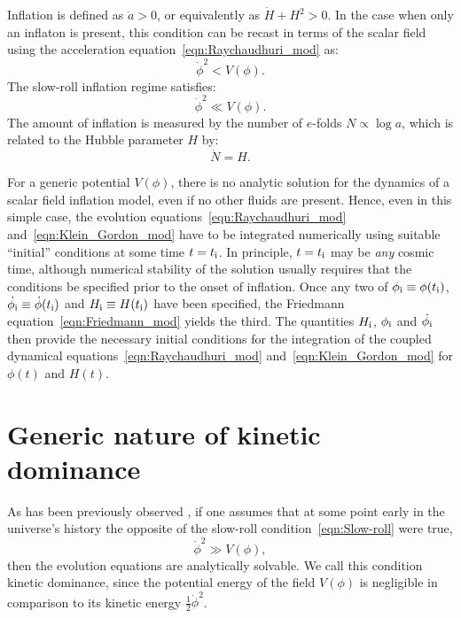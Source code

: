 Inflation is defined as \(\ddot{a}>0\), or equivalently as \(\dot{H}+H^2>0\). In the case when only an inflaton is present, this condition can be recast in terms of the scalar field using the acceleration equation~\eqref{eqn:Raychaudhuri_mod} as:
\begin{equation}
  \dot{\phi}^2<V(\phi).
  \label{eqn:Onset_inflation}
\end{equation}
The slow-roll inflation regime satisfies:
\begin{equation}
  \dot{\phi}^2\ll V(\phi).
  \label{eqn:Slow-roll}
\end{equation}
The amount of inflation is measured by the number of \(e\)-folds \(N\propto \log a\), which is related to the Hubble parameter \(H\) by:
\begin{equation}
  \dot{N}=H.\label{eqn:e-folds}
\end{equation}

For a generic potential \(V(\phi)\), there is no analytic solution for the dynamics of a scalar field inflation model, even if no other fluids are present. Hence, even in this simple case, the evolution equations~\eqref{eqn:Raychaudhuri_mod} and~\eqref{eqn:Klein_Gordon_mod} have to be integrated numerically using suitable ``initial'' conditions at some time \(t=t_{\mathrm{i}}\). In principle, \(t=t_{\mathrm{i}}\) may be {\em any\/} cosmic time, although numerical stability of the solution usually requires that the conditions be specified prior to the onset of inflation.  Once any two of \(\phi_{\mathrm{i}} \equiv \phi(t_{\mathrm{i}})\), \(\dot{\phi_{\mathrm{i}}} \equiv \dot{\phi}(t_{\mathrm{i}})\) and \(H_{\mathrm{i}} \equiv H(t_{\mathrm{i}})\) have been specified, the Friedmann equation~\eqref{eqn:Friedmann_mod} yields the third. The quantities \(H_{\mathrm{i}}\), \(\phi_{\mathrm{i}}\) and \(\dot{\phi_{\mathrm{i}}}\) then provide the necessary initial conditions for the integration of the coupled dynamical equations~\eqref{eqn:Raychaudhuri_mod} and~\eqref{eqn:Klein_Gordon_mod} for \(\phi(t)\) and \(H(t)\).
\section{Generic nature of kinetic dominance}
\label{sec:The_generic_nature_of_kinetic_dominance}

As has been previously observed \citep{Linde_initial_conditions_1985, belinsky_inflationary_1985,particle_astrophysics_1990}, if one assumes that at some point early in the universe's history the opposite of the slow-roll condition~\eqref{eqn:Slow-roll} were true,
\begin{equation}
  \dot\phi^2\gg V(\phi),
  \label{eqn:kddef}
\end{equation}
then the evolution equations are analytically solvable.  We call this condition kinetic dominance, since the potential energy of the field \(V(\phi)\) is negligible in comparison to its kinetic energy \(\frac{1}{2}\dot\phi^2\).

